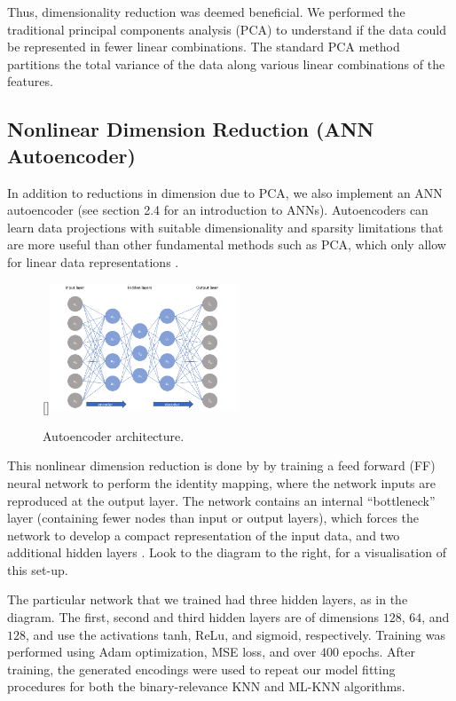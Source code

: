\documentclass[11pt]{article}
\begin{document}
Thus, dimensionality reduction was deemed beneficial. We performed the traditional principal components analysis (PCA) to understand if the data could be represented in fewer linear combinations. The standard PCA method partitions the total variance of the data along various linear combinations of the features. 

\subsection{Nonlinear Dimension Reduction (ANN Autoencoder)}

In addition to reductions in dimension due to PCA, we also implement an ANN autoencoder (see section 2.4 for an introduction to ANNs). Autoencoders can learn data projections with suitable dimensionality and sparsity limitations that are more useful than other fundamental methods such as PCA, which only allow for linear data representations \autocite{Alkhayrat}.

\begin{figure}
    \begin{center}
        \raisebox{0pt}[\dimexpr{}\baselineskip\relax]{\includegraphics[width=0.5\textwidth]{autoencoder_diagram.png}}
        \caption{Autoencoder architecture.}
    \end{center}
\end{figure}

This nonlinear dimension reduction is done by by training a feed forward (FF) neural network to perform the identity mapping, where the network inputs are reproduced at the output layer. The network contains an internal “bottleneck” layer (containing fewer nodes than input or output layers), which forces the network to develop a compact representation of the input data, and two additional hidden layers \autocite{Kramer}. Look to the diagram to the right, for a visualisation of this set-up. 

The particular network that we trained had three hidden layers, as in the diagram. The first, second and third hidden layers are of dimensions $128$, $64$, and $128$, and use the activations tanh, ReLu, and sigmoid, respectively. Training was performed using Adam optimization, MSE loss, and over $400$ epochs. After training, the generated encodings were used to repeat our model fitting procedures for both the binary-relevance KNN and ML-KNN algorithms. 
\end{document}
